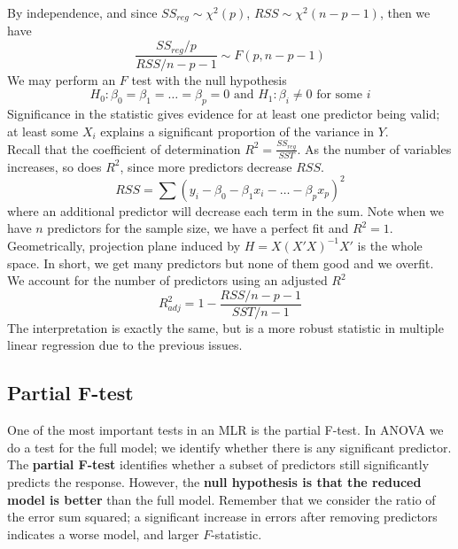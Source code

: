 \documentclass[12pt, a4paper]{article}
\theoremstyle{definition}
\newcommand{\f}{\frac}
\begin{document}
		By independence, and since $SS_{reg} \sim \chi^2(p)$, $RSS \sim \chi^2(n-p-1)$, then we have 
		$$\f{SS_{reg}/p}{RSS/n-p-1} \sim F(p, n-p-1)$$
		We may perform an $F$ test with the null hypothesis $$H_0: \beta_0 = \beta_1 = \ldots = \beta_p = 0 \text{ and } H_1: \beta_i \neq 0 \text{ for some } i$$
		Significance in the statistic gives evidence for at least one predictor being valid; at least some $X_i$ explains a significant proportion of the variance in $Y$.\\
		
		Recall that the coefficient of determination $R^2 = \f{SS_{reg}}{SST}$. As the number of variables increases, so does $R^2$, since more predictors decrease $RSS$. 
		$$
			RSS = \sum (y_i - \beta_0 - \beta_1 x_i - \ldots - \beta_px_p)^2
		$$ 
		where an additional predictor will decrease each term in the sum. Note when we have $n$ predictors for the sample size, we have a perfect fit and $R^2 = 1$. Geometrically, projection plane induced by $H = X(X'X)^{-1}X'$ is the whole space. In short, we get many predictors but none of them good and we overfit. We account for the number of predictors using an adjusted $R^2$
			$$
				R^2_{adj}  = 1 - \f{RSS / n-p-1}{SST / n-1}
			$$
		The interpretation is exactly the same, but is a more robust statistic in multiple linear regression due to the previous issues.
		
		\subsection{Partial F-test}
		
		One of the most important tests in an MLR is the partial F-test. In ANOVA we do a test for the full model; we identify whether there is any significant predictor. The {\bf partial F-test} identifies whether a subset of predictors still significantly predicts the response. However, the {\bf null hypothesis is that the reduced model is better} than the full model. Remember that we consider the ratio of the error sum squared; a significant increase in errors after removing predictors indicates a worse model, and larger $F$-statistic.\\
		
\end{document}
